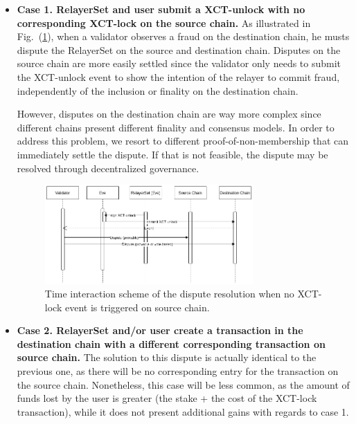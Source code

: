     \begin{itemize}
        \item \textbf{Case 1. RelayerSet and user submit a XCT-unlock with no corresponding XCT-lock on the source chain.}
        As illustrated in Fig.~(\ref{fig:dispute1}), when a validator observes a fraud on the destination chain, he musts dispute the RelayerSet on the source and destination chain. Disputes on the source chain are more easily settled since the validator only needs to submit the XCT-unlock event to show the intention of the relayer to commit fraud, independently of the inclusion or finality on the destination chain. 
        
        However, disputes on the destination chain are way more complex since different chains present different finality and consensus models. In order to address this problem, we resort to different proof-of-non-membership that can immediately settle the dispute. If that is not feasible, the dispute may be resolved through decentralized governance.
        
        \begin{figure}[h]
            \centering
            \includegraphics[width=0.75\textwidth]{images/mosaic/phase3/dispute1.png}
            \caption{Time interaction scheme of the dispute resolution when no XCT-lock event is triggered on source chain.}
            \label{fig:dispute1}
        \end{figure}
        
        
        \item \textbf{Case 2. RelayerSet and/or user create a transaction in the destination chain with a different corresponding transaction on source chain.}
        The solution to this dispute is actually identical to the previous one, as there will be no corresponding entry for the transaction on the source chain. Nonetheless, this case will be less common, as the amount of funds lost by the user is greater (the stake + the cost of the XCT-lock transaction), while it does not present additional gains with regards to case 1.
        

\end{itemize}
